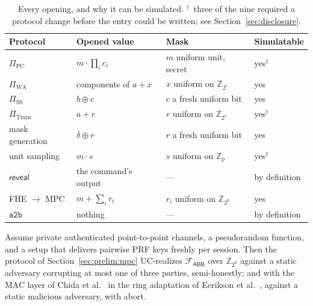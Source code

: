 \documentclass[11pt]{article}
\newcommand{\bt}[1]{\texttt{#1}}
\newcommand{\Z}{\mathbb{Z}}
\newcommand{\Fabb}{\mathcal{F}_{\mathsf{ABB}}}
\begin{document}
\begin{table}[htb]
\centering
\small
\begin{tabular}{@{}llll@{}}
\toprule
Protocol & Opened value & Mask & Simulatable \\
\midrule
$\Pi_{\mathrm{PC}}$ & $m \cdot \prod_i c_i$ & $m$ uniform unit, secret & yes$^{\dagger}$ \\
$\Pi_{\mathrm{WA}}$ & components of $a + x$ & $x$ uniform on $\Z_{2^\ell}$ & yes \\
$\Pi_{\mathrm{SS}}$ & $b \oplus c$ & $c$ a fresh uniform bit & yes \\
$\Pi_{\mathrm{Trunc}}$ & $a + r$ & $r$ uniform on $\Z_{2^\ell}$ & yes$^{\dagger}$ \\
mask generation & $\delta \oplus r$ & $r$ a fresh uniform bit & yes \\
unit sampling & $m \cdot s$ & $s$ uniform on $\Z_p$ & yes$^{\dagger}$ \\
$\mathsf{reveal}$ & the command's output & --- & by definition \\
FHE $\to$ MPC & $m + \sum_i r_i$ & $r_i$ uniform on $\Z_{2^k}$ & yes \\
$\bt{a2b}$ & nothing & --- & by definition \\
\bottomrule
\end{tabular}
\caption{Every opening, and why it can be simulated. $^{\dagger}$~three of the nine required a
protocol change before the entry could be written; see Section~\ref{sec:disclosure}.}
\label{tab:openings}
\end{table}

\begin{theorem}
\label{thm:uc}
Assume private authenticated point-to-point channels, a pseudorandom function, and a setup
that delivers pairwise PRF keys freshly per session. Then the protocol of
Section~\ref{sec:prelim:mpc} UC-realizes $\Fabb$ over $\Z_{2^k}$ against a static adversary
corrupting at most one of three parties, semi-honestly; and with the MAC layer of Chida et
al.~\cite{Chida} in the ring adaptation of Eerikson et al.~\cite{Eerikson}, against a static
malicious adversary, with abort.
\end{theorem}
\end{document}
